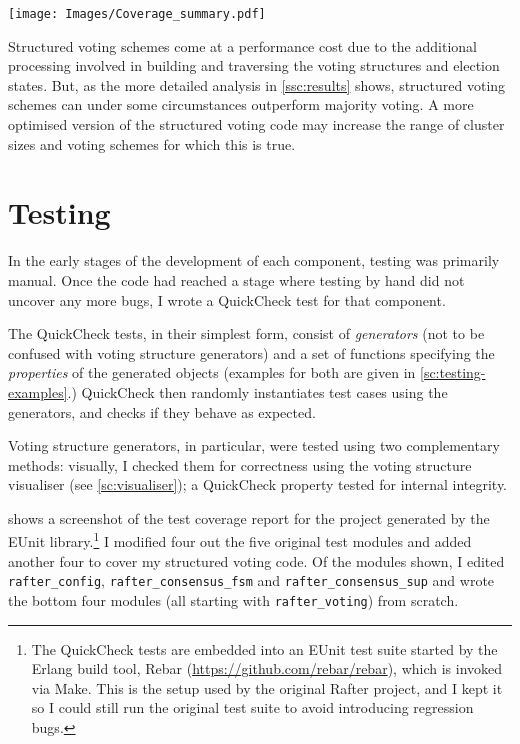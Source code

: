 \documentclass[12pt,chapterprefix=true,toc=bibliography,numbers=noendperiod,
               footnotes=multiple,twoside]{scrreprt}
\begin{document}
\begin{enumerate}
\begin{table}[bt]
    \centering
    \texttt{[image: Images/Coverage\_summary.pdf]}
    \caption[Unit test coverage]{Unit test coverage of the structured voting code. This is a screenshot of the test coverage report for the project generated by the EUnit library -- see \cref{sc:testing} for further details. Note in particular the high coverage of the last four modules (\texttt{rafter\_voting*}), which were written as part of this project.}
    \label{tab:coverage}
\end{table}

        Structured voting schemes come at a performance cost due to the additional processing involved in building and traversing the voting structures and election states. But, as the more detailed analysis in \cref{ssc:results} shows, structured voting schemes can under some circumstances outperform majority voting. A more optimised version of the structured voting code may increase the range of cluster sizes and voting schemes for which this is true.
\end{enumerate}

\section{Testing}
\label{sc:testing}

In the early stages of the development of each component, testing was primarily manual. Once the code had reached a stage where testing by hand did not uncover any more bugs, I wrote a QuickCheck test for that component.

The QuickCheck tests, in their simplest form, consist of \emph{generators} (not to be confused with voting structure generators) and a set of functions specifying the \emph{properties} of the generated objects (examples for both are given in \cref{sc:testing-examples}.) QuickCheck then randomly instantiates test cases using the generators, and checks if they behave as expected.

Voting structure generators, in particular, were tested using two complementary methods: visually, I checked them for correctness using the voting structure visualiser (see \cref{sc:visualiser}); a QuickCheck property tested for internal integrity.

 shows a screenshot of the test coverage report for the project generated by the EUnit library.\footnote{The QuickCheck tests are embedded into an EUnit test suite started by the Erlang build tool, Rebar (\url{https://github.com/rebar/rebar}), which is invoked via Make. This is the setup used by the original Rafter project, and I kept it so I could still run the original test suite to avoid introducing regression bugs.} I modified four out the five original test modules and added another four to cover my structured voting code. Of the modules shown, I edited \texttt{rafter\_config}, \texttt{rafter\_consensus\_fsm} and \texttt{rafter\_consensus\_sup} and wrote the bottom four modules (all starting with \texttt{rafter\_voting}) from scratch.
\end{document}
